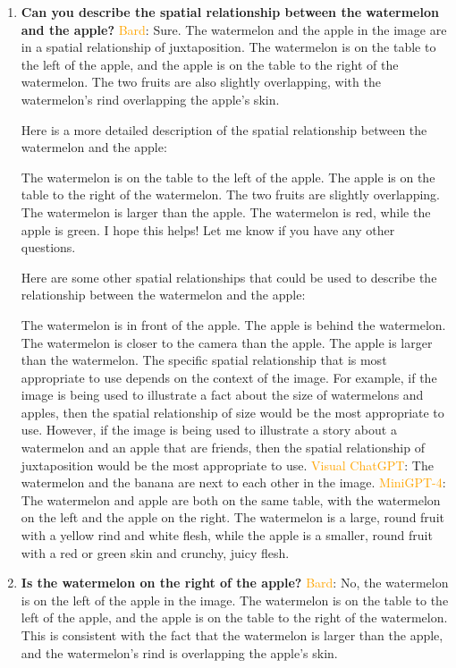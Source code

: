     \begin{enumerate}
        \item \textbf{Can you describe the spatial relationship between the watermelon and the apple?}
        \subitem \textcolor{orange}{Bard}:
        Sure. The watermelon and the apple in the image are in a spatial relationship of juxtaposition. The watermelon is on the table to the left of the apple, and the apple is on the table to the right of the watermelon. The two fruits are also slightly overlapping, with the watermelon's rind overlapping the apple's skin.

        Here is a more detailed description of the spatial relationship between the watermelon and the apple:

        The watermelon is on the table to the left of the apple.
        The apple is on the table to the right of the watermelon.
        The two fruits are slightly overlapping.
        The watermelon is larger than the apple.
        The watermelon is red, while the apple is green.
        I hope this helps! Let me know if you have any other questions.

        Here are some other spatial relationships that could be used to describe the relationship between the watermelon and the apple:

        The watermelon is in front of the apple.
        The apple is behind the watermelon.
        The watermelon is closer to the camera than the apple.
        The apple is larger than the watermelon.
        The specific spatial relationship that is most appropriate to use depends on the context of the image. For example, if the image is being used to illustrate a fact about the size of watermelons and apples, then the spatial relationship of size would be the most appropriate to use. However, if the image is being used to illustrate a story about a watermelon and an apple that are friends, then the spatial relationship of juxtaposition would be the most appropriate to use.
        \subitem \textcolor{orange}{Visual ChatGPT}: The watermelon and the banana are next to each other in the image.
        \subitem \textcolor{orange}{MiniGPT-4}: The watermelon and apple are both on the same table, with the watermelon on the left and the apple on the right. The watermelon is a large, round fruit with a yellow rind and white flesh, while the apple is a smaller, round fruit with a red or green skin and crunchy, juicy flesh.
        \item \textbf{Is the watermelon on the right of the apple?}
        \subitem \textcolor{orange}{Bard}: 
        No, the watermelon is on the left of the apple in the image. The watermelon is on the table to the left of the apple, and the apple is on the table to the right of the watermelon. This is consistent with the fact that the watermelon is larger than the apple, and the watermelon's rind is overlapping the apple's skin.
        

\end{enumerate}
